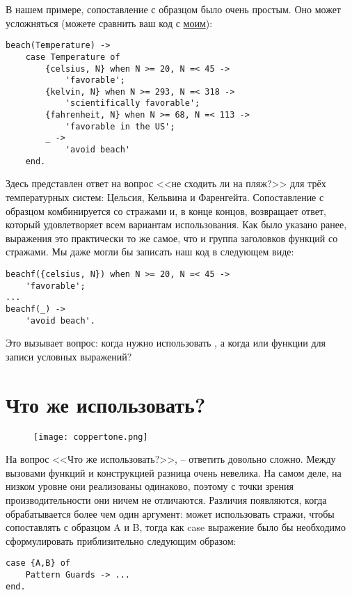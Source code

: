 В нашем примере, сопоставление с образцом было очень простым.
Оно может усложняться (можете сравнить ваш код с \href{http://learnyousomeerlang.com/static/erlang/cases.erl}{моим}):
\begin{lstlisting}[style=erlang]
beach(Temperature) ->
    case Temperature of
        {celsius, N} when N >= 20, N =< 45 ->
            'favorable';
        {kelvin, N} when N >= 293, N =< 318 ->
            'scientifically favorable';
        {fahrenheit, N} when N >= 68, N =< 113 ->
            'favorable in the US';
        _ ->
            'avoid beach'
    end.
\end{lstlisting}
Здесь представлен ответ на вопрос <<не сходить ли  на пляж?>> для трёх температурных систем: Цельсия, Кельвина и Фаренгейта.
Сопоставление с образцом комбинируется со стражами и, в конце концов, возвращает ответ, который удовлетворяет всем вариантам использования.
Как было указано ранее,  выражения  это практически то же самое, что и группа заголовков функций со стражами.
Мы даже могли бы записать наш код в следующем виде:
\begin{lstlisting}[style=erlang]
beachf({celsius, N}) when N >= 20, N =< 45 ->
    'favorable';
...
beachf(_) ->
    'avoid beach'.
\end{lstlisting}

Это вызывает вопрос: когда нужно использовать , а когда  или функции для записи условных выражений?
\section{Что же использовать?}
\label{which-to-use}
\begin{figure}[h!]
    \centering
    \texttt{[image: coppertone.png]}
\end{figure}
На вопрос <<Что же использовать?>>, \--- ответить довольно сложно.
Между вызовами функций и конструкцией  разница очень невелика.
На самом деле, на низком уровне они реализованы одинаково, поэтому с точки зрения производительности они ничем не отличаются.
Различия появляются, когда обрабатывается более чем один аргумент:  может использовать стражи, чтобы сопоставлять  с образцом A и B, тогда как case выражение было бы необходимо сформулировать приблизительно следующим образом:
\begin{lstlisting}[style=erlang]
case {A,B} of
    Pattern Guards -> ...
end.
\end{lstlisting}

